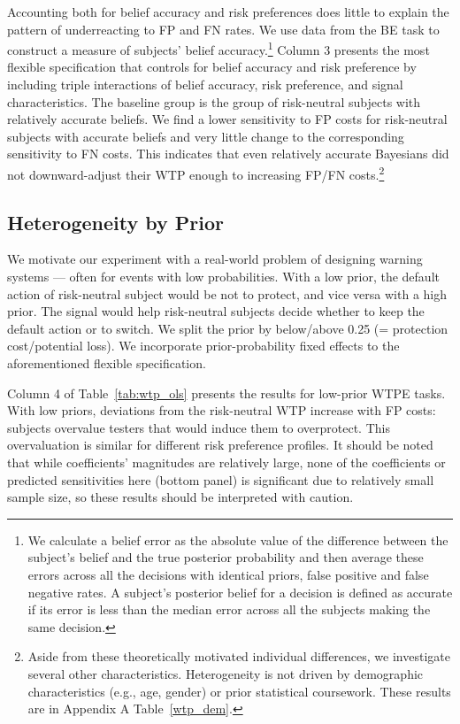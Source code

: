 \documentclass[12pt,a4paper]{article}
\begin{document}
Accounting both for belief accuracy and risk preferences does little to explain the pattern of underreacting to FP and FN rates. We use data from the BE task to construct a measure of subjects' belief accuracy.\footnote{We calculate a belief error as the absolute value of the difference between the subject's belief and the true posterior probability and then average these errors across all the decisions with identical priors, false positive and false negative rates. A subject's posterior belief for a decision is defined as accurate if its error is less than the median error across all the subjects making the same decision.} Column 3 presents the most flexible specification that controls for belief accuracy and risk preference by including triple interactions of belief accuracy, risk preference, and signal characteristics. The baseline group is the group of risk-neutral subjects with relatively accurate beliefs. We find a lower sensitivity to FP costs for risk-neutral subjects with accurate beliefs and very little change to the corresponding sensitivity to FN costs. This indicates that even relatively accurate Bayesians did not downward-adjust their WTP enough to increasing FP/FN costs.\footnote{Aside from these theoretically motivated individual differences, we investigate several other characteristics.  Heterogeneity is not driven by demographic characteristics (e.g., age, gender) or prior statistical coursework.  These results are in Appendix A Table~\ref{wtp_dem}.}
  

\subsection{Heterogeneity by Prior}

We motivate our experiment with a real-world problem of designing warning systems --- often for events with low probabilities. With a low prior, the default action of risk-neutral subject would be not to protect, and vice versa with a high prior. The signal would help risk-neutral subjects decide whether to keep the default action or to switch. We split the prior by below/above 0.25 (= protection cost/potential loss).  We incorporate prior-probability fixed effects to the aforementioned flexible specification. 

Column 4 of Table~\ref{tab:wtp_ols} presents the results for low-prior WTPE tasks. With low priors, deviations from the risk-neutral WTP increase with FP costs: subjects overvalue testers that would induce them to overprotect. This overvaluation is similar for different risk preference profiles. 
It should be noted that while coefficients' magnitudes are relatively large, none of the coefficients or predicted sensitivities here (bottom panel) is significant due to relatively small sample size, so these results should be interpreted with caution. 
\end{document}
